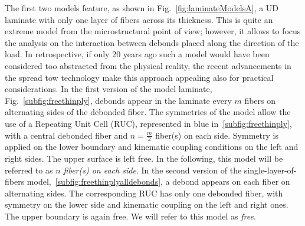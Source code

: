 \documentclass[review]{elsarticle}
\begin{document}
The first two models feature, as shown in Fig.~\ref{fig:laminateModelsA}, a UD laminate with only one layer of fibers across its thickness. This is quite an extreme model from the microstructural point of view; however, it allows to focus the analysis on the interaction between debonds placed along the direction of the load. In retrospective, if only 20 years ago such a model would have been considered too abstracted from the physical reality, the recent advancements in the spread tow technology make this approach appealing also for practical considerations. In the first version of the model laminate, Fig.~\ref{subfig:freethinply}, debonds appear in the laminate every $m$ fibers on alternating sides of the debonded fiber. The symmetries of the model allow the use of a Repeating Unit Cell (RUC), represented in blue in~\ref{subfig:freethinply}, with a central debonded fiber and $n=\frac{m}{2}$ fiber(s) on each side. Symmetry is applied on the lower boundary and kinematic coupling conditions on the left and right sides. The upper surface is left free. In the following, this model will be referred to as \textit{$n$ fiber(s) on each side}. In the second version of the single-layer-of-fibers model,~\ref{subfig:freethinplyalldebonds}, a debond appears on each fiber on alternating sides. The corresponding RUC has only one debonded fiber, with symmetry on the lower side and kinematic coupling on the left and right ones. The upper boundary is again free. We will refer to this model as \textit{free}.
\end{document}
